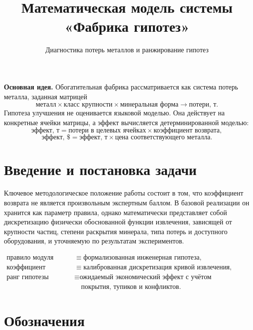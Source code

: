 \documentclass[12pt,a4paper]{article}
\title{\textbf{Математическая модель системы\\«Фабрика гипотез»}}
\author{Диагностика потерь металлов и ранжирование гипотез}
\date{}
\begin{document}
\maketitle

\begin{mainbox}
\textbf{Основная идея.}
Обогатительная фабрика рассматривается как система потерь металла,
заданная матрицей
\[
  \text{металл} \times \text{класс крупности} \times \text{минеральная форма}
  \longrightarrow \text{потери, т}.
\]
Гипотеза улучшения не оценивается языковой моделью.
Она действует на конкретные ячейки матрицы, а эффект вычисляется
детерминированной моделью:
\[
  \text{эффект, т} =
  \text{потери в целевых ячейках}
  \times
  \text{коэффициент возврата},
\]
\[
  \text{эффект, \$} =
  \text{эффект, т}
  \times
  \text{цена соответствующего металла}.
\]
\end{mainbox}

\tableofcontents
\newpage

\section{Введение и постановка задачи}

Ключевое методологическое положение работы состоит в том, что коэффициент
возврата не является произвольным экспертным баллом. В базовой реализации он
хранится как параметр правила, однако математически представляет собой
дискретизацию физически обоснованной функции извлечения, зависящей от
крупности частиц, степени раскрытия минерала, типа потерь и доступного
оборудования, и уточняемую по результатам экспериментов.

\begin{formulaBox}
\[
\begin{aligned}
\text{правило модуля} &\equiv \text{формализованная инженерная гипотеза},\\
\text{коэффициент правила} &\equiv
  \text{калиброванная дискретизация кривой извлечения},\\
\text{ранг гипотезы} &\equiv
  \text{ожидаемый экономический эффект с учётом реализуемости,}\\
  &\quad \text{покрытия, тупиков и конфликтов.}
\end{aligned}
\]
\end{formulaBox}

\section{Обозначения}
\end{document}

